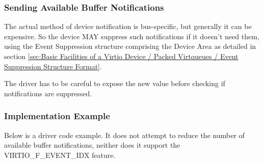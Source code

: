 \subsubsection{Sending Available Buffer Notifications}\label{sec:Basic Facilities
of a Virtio Device / Packed Virtqueues / Supplying Buffers to The Device
/ Sending Available Buffer Notifications}

The actual method of device notification is bus-specific, but generally
it can be expensive.  So the device MAY suppress such notifications if it
doesn't need them, using the Event Suppression structure comprising the
Device Area as detailed in section \ref{sec:Basic
Facilities of a Virtio Device / Packed Virtqueues / Event
Suppression Structure Format}.

The driver has to be careful to expose the new 
value before checking if notifications are suppressed.

\subsubsection{Implementation Example}\label{sec:Basic Facilities of a Virtio Device / Packed Virtqueues / Supplying Buffers to The Device / Implementation Example}

Below is a driver code example. It does not attempt to reduce
the number of available buffer notifications, neither does it support
the VIRTIO_F_EVENT_IDX feature.

